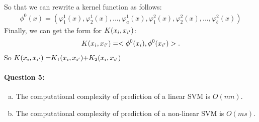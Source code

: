 \documentclass[letterpaper,11pt]{article}
\begin{document}
\begin{enumerate}[(a)]
\begin{enumerate}
So that we can rewrite a kernel function as follows:
\begin{eqnarray}
{\phi ^0}(x) = (\varphi _1^1(x),\varphi _2^1(x),...,\varphi _a^1(x),\varphi _1^2(x),\varphi _2^2(x),...,\varphi _b^2(x))
\end{eqnarray}
Finally, we can get the form for $K({x_i},{x_{i'}}{\rm{)}}$:
\begin{eqnarray}
K({x_i},{x_{i'}}{\rm{)}} =  < {\phi ^0}({x_i}),{\phi ^0}({x_{i'}}) >.
\end{eqnarray}
So $K({x_i},{x_{i'}}{\rm{)  = }}{K_1}({x_i},{x_{i'}}{\rm{)  + }}{K_2}({x_i},{x_{i'}}{\rm{)}}$
\end{enumerate}
\end{enumerate}

\paragraph{Question 5:}
\begin{enumerate}[(a)]
\item \begin{enumerate}
The computational complexity of prediction of a linear SVM is $O(mn)$.

\end{enumerate}

\item \begin{enumerate}
The computational complexity of prediction of a non-linear SVM is $O(ms)$.

\end{enumerate}
\end{enumerate}
\end{document}
